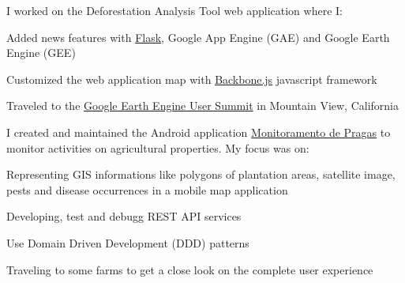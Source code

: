 \documentclass[]{joaosoares-resume}
\begin{document}
\begin{minipage}[t]{0.64\textwidth}
{\justifying I worked on the Deforestation Analysis Tool web application where I:\par} 
\begin{tightemize}
\item Added news features with \href{http://flask.pocoo.org}{Flask}, Google App Engine (GAE) and Google Earth Engine (GEE)
\item Customized the web application map with \href{https://backbonejs.org}{Backbone.js} javascript framework
\item Traveled to the \href{http://earthenginesummit2015.earthoutreach.org/}{Google Earth Engine User Summit} in Mountain View, California
\end{tightemize}
\sectionsep

{\justifying I created and maintained the Android application \href{https://play.google.com/store/apps/details?id=br.agr.terras.monitoramentopragas}{Monitoramento de Pragas} to monitor activities on agricultural properties. My focus was on:\par}
\begin{tightemize}
\item Representing GIS informations like polygons of plantation areas, satellite image, pests and disease occurrences in a mobile map application
\item Developing, test and debugg REST API services
\item Use Domain Driven Development (DDD) patterns
\item Traveling to some farms to get a close look on the complete user experience
\end{tightemize}
\sectionsep


\end{minipage}
\end{document}
